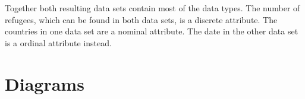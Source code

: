 Together both resulting data sets contain most of the data types. The number of refugees, which can be found in both data sets, is a discrete attribute. The countries in one data set are a nominal attribute. The date in the other data set is a ordinal attribute instead.









\section{Diagrams}

